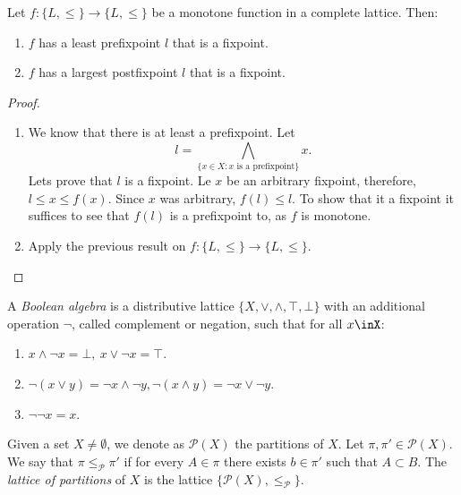 \begin{theorem}
  Let $f:\{L,\le\}\to \{L,\le\}$ be a monotone function in a complete lattice. Then:
  \begin{enumerate}
  \item $f$ has a least prefixpoint $l$ that is a fixpoint.
  \item $f$ has a largest postfixpoint $l$ that is a fixpoint.
  \end{enumerate}
\end{theorem}
\begin{proof}\\
  
  \begin{enumerate}
  \item We know that there is at least a prefixpoint. Let
    $$l = \bigwedge_{\{x\in X: x\text{ is a prefixpoint}\}} x .$$ 
    Lets prove that $l$ is a fixpoint. Le $x$ be an arbitrary fixpoint, therefore, $l \le x \le f(x)$. Since $x$ was arbitrary, $f(l) \le l$. To show that it a fixpoint it suffices to see that $f(l)$ is a prefixpoint to, as $f$ is monotone.
  \item Apply the previous result on $f:\{L,\le\}\to \{L,\le\}$.
  \end{enumerate}
\end{proof}


\begin{definition}
  A \emph{Boolean algebra} is a distributive lattice  $\{X, \vee, \wedge, \top,\bot\}$ with an additional operation $\neg$, called complement or negation, such that for all $x\inX$:
  \begin{enumerate}
  \item $ x\wedge \neg x = \bot,\ x\vee \neg x = \top $.
  \item $ \neg(x \vee y) = \neg x \wedge \neg y,  \neg(x \wedge y) = \neg x \vee \neg y$.
  \item $\neg \neg x = x$.
  \end{enumerate}
\end{definition}




\begin{definition}
Given a set $X\ne \emptyset$, we denote as $\mathcal{P}(X)$ the partitions of $X$. Let $\pi,\pi'\in \mathcal{P}(X)$. We say that $\pi\le_{\mathcal{P}}\pi'$ if for every $A\in \pi$ there exists $b\in \pi'$ such that $A\subset B$. The \emph{lattice of partitions} of $X$ is the lattice $\{\mathcal{P}(X),\le_{\mathcal{P}}\}$.
\end{definition}

